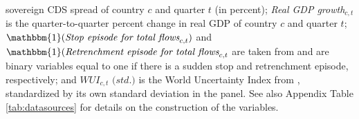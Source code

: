 \documentclass[12pt,oneside,leqno]{article}
\newcommand*{\TableDir}{.}
\begin{document}
\begin{table}[!h]
{\begin{threeparttable}
\begin{tablenotes}[flushleft]
sovereign CDS spread of country $c$ and quarter $t$ (in percent); \textit{Real GDP growth}$_{c,t}$ is the quarter-to-quarter percent change in real GDP of country $c$ and quarter $t$; $\mathbbm{1}(\textit{Stop episode for total flows}_{c,t})$ and $\mathbbm{1}(\textit{Retrenchment episode for total flows}_{c,t}$ are taken from \citet{forbes2020capital} and are binary variables equal to one if there is a sudden stop and retrenchment episode, respectively; and $\textit{WUI}_{c,t}\textit{ (std.)}$ is the World Uncertainty Index from \citet{ahir2018world}, standardized by its own standard deviation in the panel. See also Appendix Table \ref{tab:datasources} for details on the construction of the variables.
\end{tablenotes}
\end{threeparttable}
}
\end{table}


\clearpage
\begin{table}[!h]
\caption{Country Risk, Country Sentiment, and asset prices}\centering \label{tab:validation}
\end{table}
\end{document}
